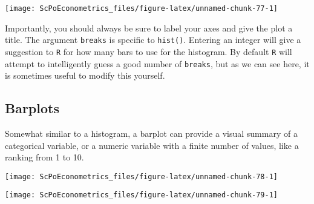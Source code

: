\documentclass[]{book}
\newenvironment{Shaded}{\begin{snugshade}}{\end{snugshade}}
\newcommand{\DataTypeTok}[1]{\textcolor[rgb]{0.13,0.29,0.53}{#1}}
\newcommand{\KeywordTok}[1]{\textcolor[rgb]{0.13,0.29,0.53}{\textbf{#1}}}
\newcommand{\NormalTok}[1]{#1}
\newcommand{\OperatorTok}[1]{\textcolor[rgb]{0.81,0.36,0.00}{\textbf{#1}}}
\newcommand{\StringTok}[1]{\textcolor[rgb]{0.31,0.60,0.02}{#1}}
\begin{document}
\begin{center}\texttt{[image: ScPoEconometrics\_files/figure-latex/unnamed-chunk-77-1]} \end{center}

Importantly, you should always be sure to label your axes and give the plot a title. The argument \texttt{breaks} is specific to \texttt{hist()}. Entering an integer will give a suggestion to \texttt{R} for how many bars to use for the histogram. By default \texttt{R} will attempt to intelligently guess a good number of \texttt{breaks}, but as we can see here, it is sometimes useful to modify this yourself.

\hypertarget{barplots}{%
\subsection{Barplots}\label{barplots}}

Somewhat similar to a histogram, a barplot can provide a visual summary of a categorical variable, or a numeric variable with a finite number of values, like a ranking from 1 to 10.

\begin{Shaded}
\end{Shaded}

\begin{center}\texttt{[image: ScPoEconometrics\_files/figure-latex/unnamed-chunk-78-1]} \end{center}

\begin{Shaded}
\end{Shaded}

\begin{center}\texttt{[image: ScPoEconometrics\_files/figure-latex/unnamed-chunk-79-1]} \end{center}
\end{document}
